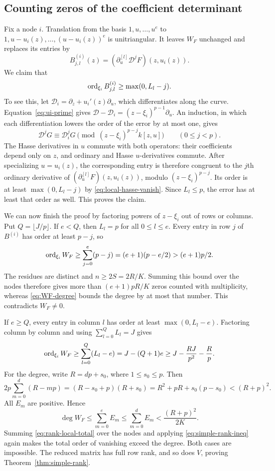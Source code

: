 \subsection{Counting zeros of the coefficient determinant}
Fix a node $i$. Translation from the basis $1,u,\ldots,u^e$ to
$1,u-u_i(z),\ldots,(u-u_i(z))^e$ is unitriangular. It leaves $W_F$ unchanged
and replaces its entries by
\[
 B^{(i)}_{j,l}(z)=(\partial_u^{[l]}\mathcal D^jF)(z,u_i(z)).
\]
We claim that
\begin{equation}\label{eq:Bi-order-bound}
 \operatorname{ord}_{\xi_i}B^{(i)}_{j,l}\geq\max(0,L_l-j).
\end{equation}
To see this, let $\mathcal D_i=\partial_z+u_i'(z)\partial_u$, which differentiates
along the curve. Equation~\eqref{eq:ui-prime} gives
$\mathcal D-\mathcal D_i=(z-\xi_i)^{p-1}\partial_u$. An induction, in which
each differentiation lowers the order of the error by at most one, gives
\[
 \mathcal D^jG\equiv\mathcal D_i^jG
       \pmod{(z-\xi_i)^{p-j}k[z,u]}\qquad(0\leq j<p).
\]
The Hasse derivatives in $u$ commute with both operators: their coefficients
depend only on $z$, and ordinary and Hasse $u$-derivatives commute.
After specializing $u=u_i(z)$, the corresponding entry is therefore congruent
to the $j$th ordinary derivative of
$(\partial_u^{[l]}F)(z,u_i(z))$, modulo $(z-\xi_i)^{p-j}$.
Its order is at least $\max(0,L_l-j)$ by \eqref{eq:local-hasse-vanish}.
Since $L_l\leq p$, the error has at least that order as well. This proves the claim.

We can now finish the proof by factoring powers of $z-\xi_i$ out of rows
or columns. Put $Q=\lfloor J/p\rfloor$. If $e<Q$, then $L_l=p$ for all
$0\leq l\leq e$. Every entry in row $j$ of $B^{(i)}$ has order at least
$p-j$, so
\[
 \operatorname{ord}_{\xi_i}W_F\geq\sum_{j=0}^e(p-j)
 =(e+1)(p-e/2)>(e+1)p/2.
\]
The residues are distinct and $n\geq2S=2R/K$. Summing this bound over the nodes
therefore gives more than $(e+1)pR/K$ zeros counted with multiplicity,
whereas \eqref{eq:WF-degree} bounds the degree by at most that number.
This contradicts $W_F\ne0$.

If $e\geq Q$, every entry in column $l$ has order at least
$\max(0,L_l-e)$. Factoring column by column and using
$\sum_{l=0}^Q L_l=J$ gives
\begin{equation}\label{eq:rank-local-total}
 \operatorname{ord}_{\xi_i}W_F\geq\sum_{l=0}^Q(L_l-e)
 =J-(Q+1)e\geq J-\frac{RJ}{p^2}-\frac Rp.
\end{equation}
For the degree, write $R=dp+s_0$, where $1\leq s_0\leq p$. Then
\[
 2p\sum_{m=0}^d(R-mp)
 =(R-s_0+p)(R+s_0)
 =R^2+pR+s_0(p-s_0)<(R+p)^2.
\]
All $E_m$ are positive. Hence
\[
 \deg W_F\leq\sum_{m=0}^e E_m\leq\sum_{m=0}^d E_m
 <\frac{(R+p)^2}{2K}.
\]
Summing \eqref{eq:rank-local-total} over the nodes and applying
\eqref{eq:simple-rank-ineq} again makes the total order of vanishing exceed
the degree. Both cases are impossible. The reduced matrix has full row rank,
and so does $V$, proving Theorem~\ref{thm:simple-rank}.
